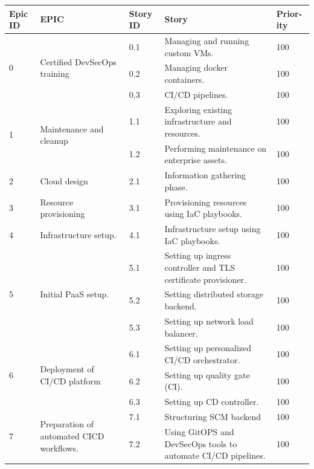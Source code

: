 \begin{longtable}[H]{|m{1cm}|m{3.25cm}|m{1cm}|m{7cm}|m{1.2cm}|}
\hline
 {\textbf{Epic ID}} & {\textbf{EPIC}} & {\textbf{Story ID}} & {\textbf{Story}} & {\textbf{Prior-ity}} \\
\endhead
\hline
\multirow{3}{1cm}{0} & \multirow{3}{3.25cm}{\raggedright Certified DevSecOps training} &	0.1 &	Managing and running custom VMs. & 100\\
\cline{3-5}
&   & 0.2 &	Managing docker containers.	& 100\\
\cline{3-5}
&   & 0.3 &	CI/CD pipelines. & 100\\
\hline
\multirow{2}{1cm}{1} & \multirow{2}{3.25cm}{Maintenance and cleanup} &	1.1	& Exploring existing infrastructure and resources. & 100\\
\cline{3-5}
&   &	1.2 & Performing maintenance on enterprise assets. & 100\\

\hline
2 & Cloud design &	2.1 &	Information gathering phase. & 100\\
\hline
3 & Resource provisioning &	3.1 &	Provisioning resources using IaC playbooks. & 100\\
\hline
4 & Infrastructure setup. &	4.1 &	Infrastructure setup using IaC playbooks. & 100\\
\hline
\multirow{3}{1cm}{5} & \multirow{3}{3.25cm}{\raggedright Initial PaaS setup.} &	5.1 &	Setting up ingress controller and TLS certificate provisioner.	 & 100\\
\cline{3-5}
&   & 5.2 &	Setting distributed storage backend.	 & 100\\
\cline{3-5}
&   & 5.3 &	Setting up network load balancer.	 & 100\\
  \hline
\multirow{3}{1cm}{6} & \multirow{3}{3.25cm}{Deployment of CI/CD platform} &	6.1 &	Setting up personalized CI/CD orchestrator.	 & 100\\
\cline{3-5}
&   & 6.2 &	Setting up quality gate (CI).	 & 100\\
\cline{3-5}
&   & 6.3 & Setting up CD controller.	 & 100\\
  \hline
\multirow{2}{1cm}{7} & \multirow{2}{3.25cm}{\raggedright Preparation of automated CICD workflows.} &	7.1 &	Structuring SCM backend	 & 100\\

\cline{3-5}
&   & 7.2 &	 \raggedright Using GitOPS and DevSecOps tools to automate CI/CD pipelines.	 & 100\\
\hline



\end{longtable}

